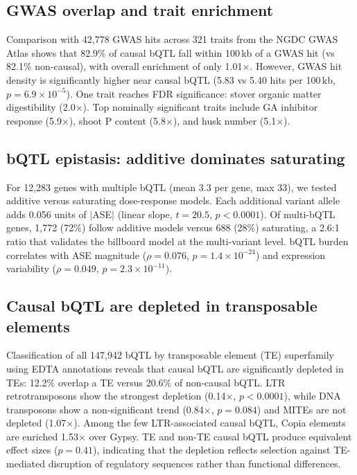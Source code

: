 \documentclass[11pt,a4paper]{article}
\begin{document}
\subsection{GWAS overlap and trait enrichment}

Comparison with 42,778 GWAS hits across 321 traits from the NGDC GWAS
Atlas shows that 82.9\% of causal bQTL fall within 100\,kb of a GWAS hit
(vs 82.1\% non-causal), with overall enrichment of only 1.01$\times$.
However, GWAS hit density is significantly higher near causal bQTL (5.83 vs
5.40 hits per 100\,kb, $p = 6.9 \times 10^{-5}$). One trait reaches
FDR significance: stover organic matter digestibility (2.0$\times$).
Top nominally significant traits include GA inhibitor response
(5.9$\times$), shoot P content (5.8$\times$), and husk number
(5.1$\times$).


\subsection{bQTL epistasis: additive dominates saturating}
\label{sec:epistasis}

For 12,283 genes with multiple bQTL (mean 3.3 per gene, max 33), we tested
additive versus saturating dose-response models. Each additional variant
allele adds 0.056 units of $|$ASE$|$ (linear slope, $t = 20.5$,
$p < 0.0001$). Of multi-bQTL genes, 1,772 (72\%) follow additive models
versus 688 (28\%) saturating, a 2.6:1 ratio that validates the billboard
model at the multi-variant level. bQTL burden correlates with ASE magnitude
($\rho = 0.076$, $p = 1.4 \times 10^{-24}$) and expression variability
($\rho = 0.049$, $p = 2.3 \times 10^{-11}$).


\subsection{Causal bQTL are depleted in transposable elements}
\label{sec:te}

Classification of all 147,942 bQTL by transposable element (TE) superfamily
using EDTA annotations reveals that causal bQTL are significantly depleted
in TEs: 12.2\% overlap a TE versus 20.6\% of non-causal bQTL. LTR
retrotransposons show the strongest depletion (0.14$\times$,
$p < 0.0001$), while DNA transposons show a non-significant trend
(0.84$\times$, $p = 0.084$) and MITEs are not depleted (1.07$\times$).
Among the few LTR-associated causal bQTL, Copia elements are enriched
1.53$\times$ over Gypsy. TE and non-TE causal bQTL produce equivalent
effect sizes ($p = 0.41$), indicating that the depletion reflects
selection against TE-mediated disruption of regulatory sequences rather
than functional differences.
\end{document}
